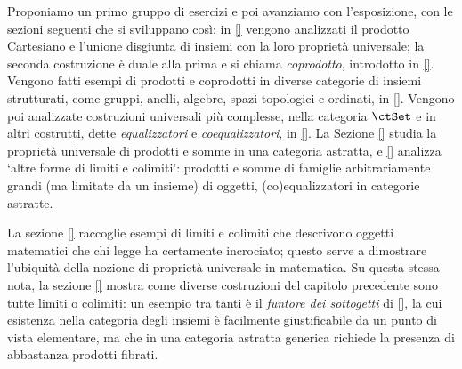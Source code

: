 Proponiamo un primo gruppo di esercizi e poi avanziamo con l'esposizione, con le sezioni seguenti che si sviluppano così: in \ref{} vengono analizzati il prodotto Cartesiano e l'unione disgiunta di insiemi con la loro proprietà universale; la seconda costruzione è duale alla prima e si chiama \emph{coprodotto}, introdotto in \ref{}. Vengono fatti esempi di prodotti e coprodotti in diverse categorie di insiemi strutturati, come gruppi, anelli, algebre, spazi topologici e ordinati, in \ref{}. Vengono poi analizzate costruzioni universali più complesse, nella categoria \(\ctSet\) e in altri costrutti, dette \emph{equalizzatori} e \emph{coequalizzatori}, in \ref{}. La Sezione \ref{} studia la proprietà universale di prodotti e somme in una categoria astratta, e \ref{} analizza `altre forme di limiti e colimiti': prodotti e somme di famiglie arbitrariamente grandi (ma limitate da un insieme) di oggetti, (co)equalizzatori in categorie astratte.

La sezione \ref{} raccoglie esempi di limiti e colimiti che descrivono oggetti matematici che chi legge ha certamente incrociato; questo serve a dimostrare l'ubiquità della nozione di proprietà universale in matematica. Su questa stessa nota, la sezione \ref{} mostra come diverse costruzioni del capitolo precedente sono tutte limiti o colimiti: un esempio tra tanti è il \emph{funtore dei sottogetti} di \ref{}, la cui esistenza nella categoria degli insiemi è facilmente giustificabile da un punto di vista elementare, ma che in una categoria astratta generica richiede la presenza di abbastanza prodotti fibrati.

